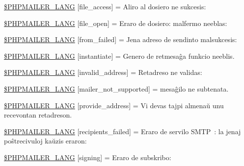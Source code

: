 \begin{DoxyCompactItemize}
\item 
\hyperlink{phpmailer_8lang-eo_8php_a7e83349023b856ef9e5c46e30ae6d51e}{\$\+P\+H\+P\+M\+A\+I\+L\+E\+R\+\_\+\+L\+A\+NG} \mbox{[}\textquotesingle{}file\+\_\+access\textquotesingle{}\mbox{]} = \textquotesingle{}Aliro al dosiero ne sukcesis\+: \textquotesingle{}
\item 
\hyperlink{phpmailer_8lang-eo_8php_a28d1a6517bf4c942a0ddd506188ad2e0}{\$\+P\+H\+P\+M\+A\+I\+L\+E\+R\+\_\+\+L\+A\+NG} \mbox{[}\textquotesingle{}file\+\_\+open\textquotesingle{}\mbox{]} = \textquotesingle{}Eraro de dosiero\+: malfermo neeblas\+: \textquotesingle{}
\item 
\hyperlink{phpmailer_8lang-eo_8php_adf832ae12155a09be077c6d5e4fd7e22}{\$\+P\+H\+P\+M\+A\+I\+L\+E\+R\+\_\+\+L\+A\+NG} \mbox{[}\textquotesingle{}from\+\_\+failed\textquotesingle{}\mbox{]} = \textquotesingle{}Jena adreso de sendinto malsukcesis\+: \textquotesingle{}
\item 
\hyperlink{phpmailer_8lang-eo_8php_ad58dde16780f4770ccf4dd282ea1f5ad}{\$\+P\+H\+P\+M\+A\+I\+L\+E\+R\+\_\+\+L\+A\+NG} \mbox{[}\textquotesingle{}instantiate\textquotesingle{}\mbox{]} = \textquotesingle{}Genero de retmesaĝa funkcio neeblis.\textquotesingle{}
\item 
\hyperlink{phpmailer_8lang-eo_8php_a42d61bcea4c79599ecb44fd062f54d47}{\$\+P\+H\+P\+M\+A\+I\+L\+E\+R\+\_\+\+L\+A\+NG} \mbox{[}\textquotesingle{}invalid\+\_\+address\textquotesingle{}\mbox{]} = \textquotesingle{}Retadreso ne validas\+: \textquotesingle{}
\item 
\hyperlink{phpmailer_8lang-eo_8php_aa2ebcb8833ee83a7ad67401c4bb3a6ad}{\$\+P\+H\+P\+M\+A\+I\+L\+E\+R\+\_\+\+L\+A\+NG} \mbox{[}\textquotesingle{}mailer\+\_\+not\+\_\+supported\textquotesingle{}\mbox{]} = \textquotesingle{} mesaĝilo ne subtenata.\textquotesingle{}
\item 
\hyperlink{phpmailer_8lang-eo_8php_a8b97897c2406b7392b056f375feeefbb}{\$\+P\+H\+P\+M\+A\+I\+L\+E\+R\+\_\+\+L\+A\+NG} \mbox{[}\textquotesingle{}provide\+\_\+address\textquotesingle{}\mbox{]} = \textquotesingle{}Vi devas tajpi almenaŭ unu recevontan retadreson.\textquotesingle{}
\item 
\hyperlink{phpmailer_8lang-eo_8php_a7589d30bb9b368327c2df015f3e6bcba}{\$\+P\+H\+P\+M\+A\+I\+L\+E\+R\+\_\+\+L\+A\+NG} \mbox{[}\textquotesingle{}recipients\+\_\+failed\textquotesingle{}\mbox{]} = \textquotesingle{}Eraro de servilo S\+M\+T\+P \+: la jenaj poŝtrecivuloj kaŭzis eraron\+: \textquotesingle{}
\item 
\hyperlink{phpmailer_8lang-eo_8php_a68e437bdb9b968a5a67320f03d231565}{\$\+P\+H\+P\+M\+A\+I\+L\+E\+R\+\_\+\+L\+A\+NG} \mbox{[}\textquotesingle{}signing\textquotesingle{}\mbox{]} = \textquotesingle{}Eraro de subskribo\+: \textquotesingle{}

\end{DoxyCompactItemize}

